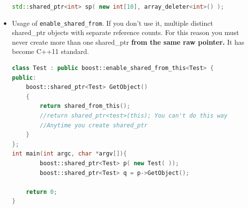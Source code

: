 \documentclass[a4paper,12pt,twoside]{book}
\begin{document}
\begin{itemize}
\begin{lstlisting}[frame=single, language=c++]
std::shared_ptr<int> sp( new int[10], array_deleter<int>() );
\end{lstlisting}

\item Usage of \texttt{enable\_shared\_from}. If you don't use it, multiple distinct shared\_ptr objects with separate reference counts. For this reason you must never create more than one shared\_ptr \textbf{from the same raw pointer.} It has become C++11 standard.
\begin{lstlisting}[frame=single, language=c++]
class Test : public boost::enable_shared_from_this<Test> {
public:
    boost::shared_ptr<Test> GetObject()
    {
        return shared_from_this();
        //return shared_ptr<test>(this); You can't do this way
        //Anytime you create shared_ptr
    }
};
int main(int argc, char *argv[]){
        boost::shared_ptr<Test> p( new Test( ));
        boost::shared_ptr<Test> q = p->GetObject();
    
    return 0;
}
\end{lstlisting}

\end{itemize}
\end{document}
